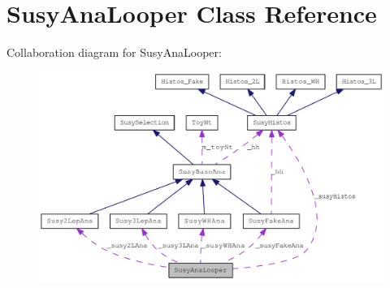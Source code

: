 \hypertarget{classSusyAnaLooper}{
\section{SusyAnaLooper Class Reference}
\label{classSusyAnaLooper}
}
Collaboration diagram for SusyAnaLooper:\nopagebreak
\begin{figure}[H]
\begin{center}
\leavevmode
\includegraphics[width=400pt]{classSusyAnaLooper__coll__graph}
\end{center}
\end{figure}
